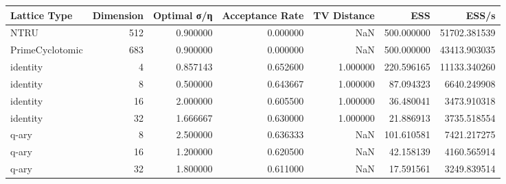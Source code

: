 \begin{tabular}{lrrrrrr}
\toprule
Lattice Type & Dimension & Optimal σ/η & Acceptance Rate & TV Distance & ESS & ESS/s \\
\midrule
NTRU & 512 & 0.900000 & 0.000000 & NaN & 500.000000 & 51702.381539 \\
PrimeCyclotomic & 683 & 0.900000 & 0.000000 & NaN & 500.000000 & 43413.903035 \\
identity & 4 & 0.857143 & 0.652600 & 1.000000 & 220.596165 & 11133.340260 \\
identity & 8 & 0.500000 & 0.643667 & 1.000000 & 87.094323 & 6640.249908 \\
identity & 16 & 2.000000 & 0.605500 & 1.000000 & 36.480041 & 3473.910318 \\
identity & 32 & 1.666667 & 0.630000 & 1.000000 & 21.886913 & 3735.518554 \\
q-ary & 8 & 2.500000 & 0.636333 & NaN & 101.610581 & 7421.217275 \\
q-ary & 16 & 1.200000 & 0.620500 & NaN & 42.158139 & 4160.565914 \\
q-ary & 32 & 1.800000 & 0.611000 & NaN & 17.591561 & 3249.839514 \\
\bottomrule
\end{tabular}
